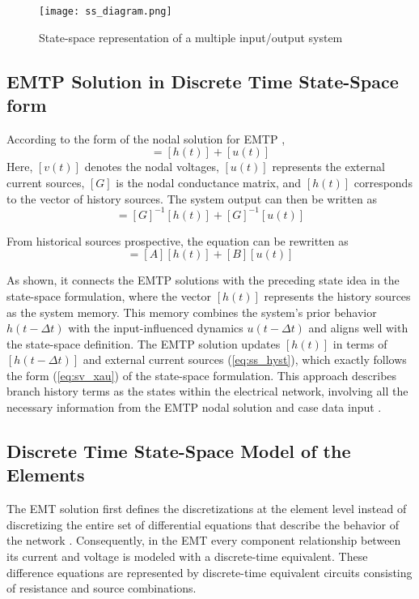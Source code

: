 \begin{figure}[htbp]
    \centering
    \texttt{[image: ss\_diagram.png]}
    \caption{State-space representation of a multiple input/output system}
    \label{fig:ss_diagram}
\end{figure}

\subsection{EMTP Solution in Discrete Time State-Space form}\label{subsec:ch3/sec5/sub3}
According to the form of the nodal solution for EMTP \autocite{4073845},
\begin{equation}
    [G][v(t)]=[h(t)]+[u(t)]
    \label{eq:ns_emtp}
\end{equation}
Here, $[v(t)]$ denotes the nodal voltages, $[u(t)]$ represents the external current sources, $[G]$ is the nodal conductance matrix, and $[h(t)]$ corresponds to the vector of history sources. The system output can then be written as
\begin{equation}
    [v(t)]=[G]^{-1}[h(t)]+[G]^{-1}[u(t)]
\end{equation}

From historical sources prospective, the equation can be rewritten as
\begin{equation}
    [h(t+\Delta t)]=[A][h(t)]+[B][u(t)]
    \label{eq:ss_hyst}
\end{equation}

As shown, it connects the EMTP solutions with the preceding state idea in the state-space formulation, where the vector $[h(t)]$ represents the history sources as the system memory. This memory combines the system's prior behavior $h(t - \Delta t)$ with the input-influenced dynamics $u(t - \Delta t)$ and aligns well with the state-space definition. The EMTP solution updates $[h(t)]$ in terms of $[h(t - \Delta t)]$  and external current sources (\ref{eq:ss_hyst}), which exactly follows the form (\ref{eq:sv_xau}) of the state-space formulation. This approach describes branch history terms as the states within the electrical network, involving all the necessary information from the EMTP nodal solution and case data input \autocite{rowell1997system}.

\subsection{Discrete Time State-Space Model of the Elements}\label{subsec:ch3/sec5/sub4}
The EMT solution first defines the discretizations at the element level instead of discretizing the entire set of differential equations that describe the behavior of the network \autocite{Linares_Rojas_2001}. Consequently, in the EMT every component relationship between its current and voltage is modeled with a discrete-time equivalent. These difference equations are represented by discrete-time equivalent circuits consisting of resistance and source combinations.

